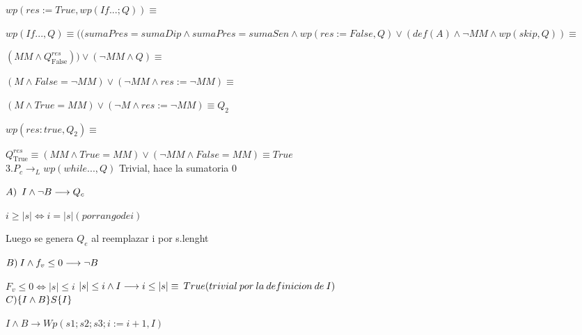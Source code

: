 \documentclass[10pt,a4paper]{article}
\begin{document}
\begin{enumerate}
\vspace{2mm} 

$wp(res := True, wp(If ...; Q)) \equiv $ %

$wp(If ..., Q) \equiv ((sumaPres = sumaDip  \land  sumaPres = sumaSen   \land  wp(res := False, Q) \lor (def (A) \land \neg MM \land wp(skip,Q)) \equiv $

$(MM \land Q^{res}_{\text{False}}) ) \lor (\neg MM \land Q) \equiv $
\vspace{2mm} \vspace{2mm} 

$(M \land False = \neg MM ) \lor (\neg MM \land res := \neg MM ) \equiv$
\vspace{2mm} 

$ (M \land True = MM ) \lor (\neg M \land res := \neg MM ) \equiv Q_2$\vspace{2mm} 

$wp(res:true, Q_2) \equiv$\vspace{2mm} \vspace{2mm} 

$Q^{res}_{\text{True}} \equiv (MM \land True = MM) \lor (\neg MM \land False=MM)\equiv True $
\vspace{2mm} \vspace{2mm} \\

${3. P_c \longrightarrow_{L} wp(while ... , Q)}$ 
Trivial, hace la sumatoria 0
\vspace{3mm} 

$\\ A) \; \: I \land \neg B  \longrightarrow Q_c $ 

 $i \geq |s| \Longleftrightarrow i = |s| (por rango de i) $ 

Luego se genera $Q_e$ al reemplazar i por s.lenght  %

{$\\ B) \: I \land f_v \leq 0 \longrightarrow \neg B$ }

$F_v \leq 0  \Longleftrightarrow   |s| \leq i $
\vspace{2mm}
 $\\ |s| \leq i \land I \longrightarrow i \leq   |s|  \equiv \: True (trivial \: por \: la \: definicion \: de \: I ) $ 
\: \; \\

$\\ C)\{I \land B\}S\{I\}$

$I \land B \longrightarrow Wp(s1;s2;s3;i:=i+1,I) $


\end{enumerate}
\end{document}
